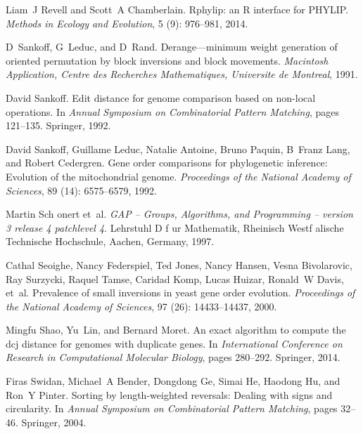 \documentclass[utf8]{Frontiers_LaTex_Templates/frontiersFPHY} %
\numberwithin{equation}{section}
\begin{document}
\begin{thebibliography}{38}
Liam~J Revell and Scott~A Chamberlain.
\newblock Rphylip: an {R} interface for {PHYLIP}.
\newblock \emph{Methods in Ecology and Evolution}, 5 (9):
  976--981, 2014.

D~Sankoff, G~Leduc, and D~Rand.
\newblock Derange---minimum weight generation of oriented permutation by block
  inversions and block movements.
\newblock \emph{Macintosh Application, Centre des Recherches Mathematiques,
  Universite de Montreal}, 1991.

David Sankoff.
\newblock Edit distance for genome comparison based on non-local operations.
\newblock In \emph{Annual Symposium on Combinatorial Pattern Matching}, pages
  121--135. Springer, 1992.

David Sankoff, Guillame Leduc, Natalie Antoine, Bruno Paquin, B~Franz Lang, and
  Robert Cedergren.
\newblock Gene order comparisons for phylogenetic inference: {E}volution of the
  mitochondrial genome.
\newblock \emph{Proceedings of the National Academy of Sciences}, 89
  (14): 6575--6579, 1992.

Martin Sch{ o}nert et~al.
\newblock \emph{{GAP} -- {Groups}, {Algorithms}, and {Programming} -- version 3
  release 4 patchlevel 4}.
\newblock Lehrstuhl D f{ u}r Mathematik, Rheinisch Westf{
  a}lische Technische Hoch\-schule, Aachen, Germany, 1997.

Cathal Seoighe, Nancy Federspiel, Ted Jones, Nancy Hansen, Vesna Bivolarovic,
  Ray Surzycki, Raquel Tamse, Caridad Komp, Lucas Huizar, Ronald~W Davis,
  et~al.
\newblock Prevalence of small inversions in yeast gene order evolution.
\newblock \emph{Proceedings of the National Academy of Sciences}, 97
  (26): 14433--14437, 2000.

Mingfu Shao, Yu~Lin, and Bernard Moret.
\newblock An exact algorithm to compute the dcj distance for genomes with
  duplicate genes.
\newblock In \emph{International Conference on Research in Computational
  Molecular Biology}, pages 280--292. Springer, 2014.

Firas Swidan, Michael~A Bender, Dongdong Ge, Simai He, Haodong Hu, and Ron~Y
  Pinter.
\newblock Sorting by length-weighted reversals: Dealing with signs and
  circularity.
\newblock In \emph{Annual Symposium on Combinatorial Pattern Matching}, pages
  32--46. Springer, 2004.


\end{thebibliography}
\end{document}
